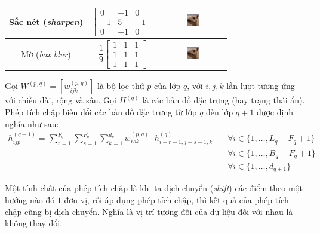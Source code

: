 \begin{table}[htb!]
\begin{tabular}{ c c c }
        Sắc nét (\textit{sharpen})   & $\begin{bmatrix}0&-1&0\\-1&5&-1\\0&-1&0\end{bmatrix}$         & \includegraphics[width=0.2\textwidth, valign=c]{image/cnn-sharp.png} \\\midrule
        Mờ (\textit{box blur})       & $\dfrac{1}{9}\begin{bmatrix}1&1&1\\1&1&1\\1&1&1\end{bmatrix}$ & \includegraphics[width=0.2\textwidth, valign=c]{image/cnn-blur.png}  \\
        \bottomrule
    \end{tabular}
\end{table}

Gọi $W^{(p,q)}=[w_{ijk}^{(p,q)}]$ là bộ lọc thứ $p$ của lớp $q$, với $i,j,k$ lần lượt tương ứng với chiều dài, rộng và sâu. Gọi $H^{(q)}$ là các bản đồ đặc trưng (hay trạng thái ẩn). Phép tích chập biến đổi các bản đồ đặc trưng từ lớp $q$ đến lớp $q+1$ được định nghĩa như sau: \cite{Aggarwal2023-zk}
\begin{align}
    h_{ijp}^{(q+1)}=\sum_{r=1}^{F_q}\sum_{s=1}^{F_q}\sum_{k=1}^{d_q} w_{rsk}^{(p,q)}\cdot h_{i+r-1,j+s-1,k}^{(q)} & \quad\forall i\in\{1,\dots,L_q-F_q+1\}           \\
                                                                                                                  & \quad\forall i\in\{1,\dots,B_q-F_q+1\} \nonumber \\
                                                                                                                  & \quad\forall i\in\{1,\dots,d_{q+1}\}   \nonumber
\end{align}

Một tính chất của phép tích chập là khi ta dịch chuyển (\textit{shift}) các điểm theo một hướng nào đó $1$ đơn vị, rồi áp dụng phép tích chập, thì kết quả của phép tích chập cũng bị dịch chuyển. Nghĩa là vị trí tương đối của dữ liệu đối với nhau là không thay đổi.

